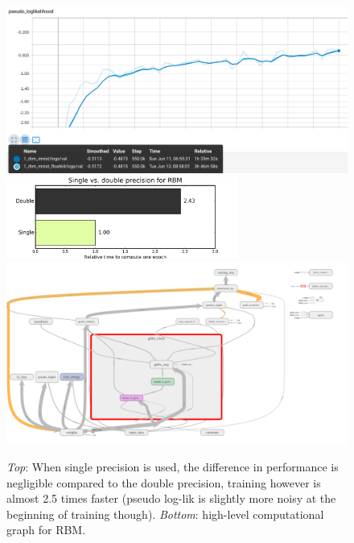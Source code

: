 \begin{figure}[h]
\begin{mdframed}
\centering
\includegraphics[width=5.8in]{rbm-mnist/float32_float64.png}
\\[1em]
\includegraphics[width=3in]{rbm-mnist/rbm_speedup.png}
\\[1em]
\includegraphics[width=5.6in]{rbm/tf_graph.png}
\caption{\emph{Top}: When single precision is used, the difference in performance is negligible compared to the double precision, training however is almost 2.5 times faster (pseudo log-lik is slightly more noisy at the beginning of training though). \emph{Bottom}: high-level computational graph for RBM.}
\end{mdframed}
\end{figure}

\clearpage
